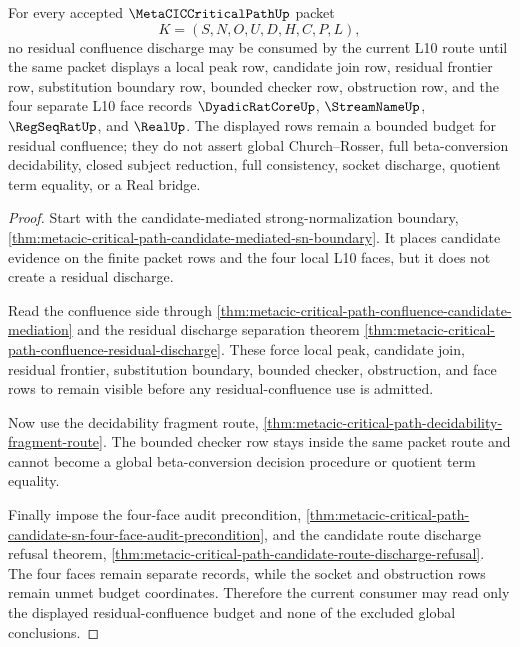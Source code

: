 \begin{theorem}
\label{thm:metacic-critical-path-residual-confluence-row-budget}
For every accepted $\MetaCICCriticalPathUp$ packet
$$
K=(S,N,O,U,D,H,C,P,L),
$$
no residual confluence discharge may be consumed by the current L10 route until the same packet displays a local peak row, candidate join row, residual frontier row, substitution boundary row, bounded checker row, obstruction row, and the four separate L10 face records $\DyadicRatCoreUp$, $\StreamNameUp$, $\RegSeqRatUp$, and $\RealUp$. The displayed rows remain a bounded budget for residual confluence; they do not assert global Church--Rosser, full beta-conversion decidability, closed subject reduction, full consistency, socket discharge, quotient term equality, or a Real bridge.
\end{theorem}
\begin{proof}
Start with the candidate-mediated strong-normalization boundary, \autoref{thm:metacic-critical-path-candidate-mediated-sn-boundary}. It places candidate evidence on the finite packet rows and the four local L10 faces, but it does not create a residual discharge.

Read the confluence side through \autoref{thm:metacic-critical-path-confluence-candidate-mediation} and the residual discharge separation theorem \autoref{thm:metacic-critical-path-confluence-residual-discharge}. These force local peak, candidate join, residual frontier, substitution boundary, bounded checker, obstruction, and face rows to remain visible before any residual-confluence use is admitted.

Now use the decidability fragment route, \autoref{thm:metacic-critical-path-decidability-fragment-route}. The bounded checker row stays inside the same packet route and cannot become a global beta-conversion decision procedure or quotient term equality.

Finally impose the four-face audit precondition, \autoref{thm:metacic-critical-path-candidate-sn-four-face-audit-precondition}, and the candidate route discharge refusal theorem, \autoref{thm:metacic-critical-path-candidate-route-discharge-refusal}. The four faces remain separate records, while the socket and obstruction rows remain unmet budget coordinates. Therefore the current consumer may read only the displayed residual-confluence budget and none of the excluded global conclusions.
\end{proof}

